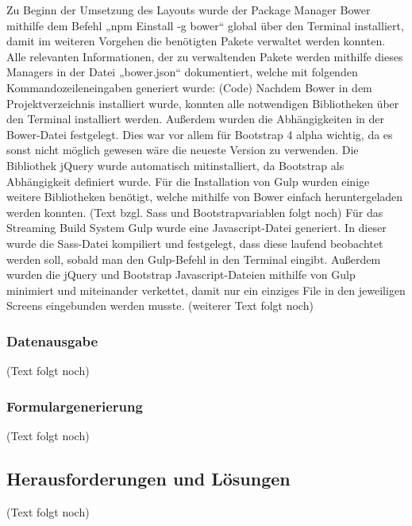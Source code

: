 	Zu Beginn der Umsetzung des Layouts wurde der Package Manager Bower mithilfe dem Befehl „npm Einstall -g bower“ global über den Terminal installiert, damit im weiteren Vorgehen die benötigten Pakete verwaltet werden konnten. Alle relevanten Informationen, der zu verwaltenden Pakete werden mithilfe dieses Managers in der Datei „bower.json“ dokumentiert, welche mit folgenden Kommandozeileneingaben generiert wurde:
	(Code)
	Nachdem Bower in dem Projektverzeichnis installiert wurde, konnten alle notwendigen Bibliotheken über den Terminal installiert werden. Außerdem wurden die Abhängigkeiten in der Bower-Datei festgelegt. Dies war vor allem für Bootstrap 4 alpha wichtig, da es sonst nicht möglich gewesen wäre die neueste Version zu verwenden. Die Bibliothek jQuery wurde automatisch mitinstalliert, da Bootstrap als Abhängigkeit definiert wurde. Für die Installation von Gulp wurden einige weitere Bibliotheken benötigt, welche mithilfe von Bower einfach heruntergeladen werden konnten.
	(Text bzgl. Sass und Bootstrapvariablen folgt noch)
	Für das Streaming Build System Gulp wurde eine Javascript-Datei generiert. In dieser wurde die Sass-Datei kompiliert und festgelegt, dass diese laufend beobachtet werden soll, sobald man den Gulp-Befehl in den Terminal eingibt. Außerdem wurden die jQuery und Bootstrap Javascript-Dateien mithilfe von Gulp minimiert und miteinander verkettet, damit nur ein einziges File in den jeweiligen Screens eingebunden werden musste.
	(weiterer Text folgt noch)

    \subsubsection{Datenausgabe}

	(Text folgt noch)

    \subsubsection{Formulargenerierung}

	(Text folgt noch)

  \subsection{Herausforderungen und Lösungen}

	(Text folgt noch)
